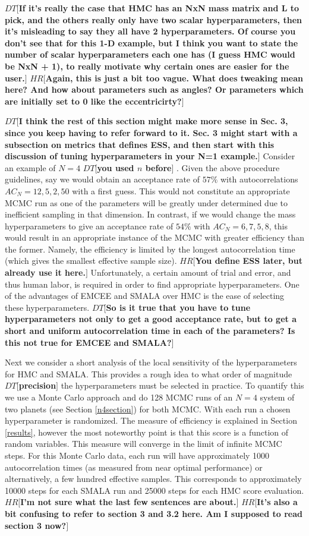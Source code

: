 \documentclass{aa}
\def\memohr#1{\color{blue}$HR[${\bf #1}$]$ \color{black}}
\def\memodt#1{\color{green}$DT[${\bf #1}$]$ \color{black}}
\begin{document}
\memodt{If it's really the case that HMC has an NxN mass matrix and L to pick, and the others really only have two scalar hyperparameters, then it's misleading to say they all have 2 hyperparameters. Of course you don't see that for this 1-D example, but I think you want to state the number of scalar hyperparameters each one has (I guess HMC would be NxN + 1), to really motivate why certain ones are easier for the user.}
\memohr{Again, this is just a bit too vague. What does tweaking mean here? And how about parameters such as angles? Or parameters which are initially set to 0 like the eccentricirty?}

\memodt{I think the rest of this section might make more sense in Sec. 3, since you keep having to refer forward to it. Sec. 3 might start with a subsection on metrics that defines ESS, and then start with this discussion of tuning hyperparameters in your N=1 example.}
Consider an example of $N=4$ \memodt{you used $n$ before}. 
Given the above procedure guidelines, say we would obtain an acceptance rate of $57\%$ with autocorrelations $AC_N = 12, 5, 2, 50$ with a first guess.
This would not constitute an appropriate MCMC run as one of the parameters will be greatly under determined due to inefficient sampling in that dimension. 
In contrast, if we would change the mass hyperparameters to give an acceptance rate of $54\%$ with $AC_N = 6, 7, 5, 8$, this would result in an appropriate instance of the MCMC with greater efficiency than the former. 
Namely, the efficiency is limited by the longest autocorrelation time (which gives the smallest effective sample size). 
\memohr{You define ESS later, but already use it here.}
Unfortunately, a certain amount of trial and error, and thus human labor, is required in order to find appropriate hyperparameters. 
One of the advantages of EMCEE and SMALA over HMC is the ease of selecting these hyperparameters. \memodt{So is it true that you have to tune hyperparameters not only to get a good acceptance rate, but to get a short and uniform autocorrelation time in each of the parameters? Is this not true for EMCEE and SMALA?}

Next we consider a short analysis of the local sensitivity of the hyperparameters for HMC and SMALA. 
This provides a rough idea to what order of magnitude \memodt{precision} the hyperparameters must be selected in practice. 
To quantify this we use a Monte Carlo approach and do 128 MCMC runs of an $N=4$ system of two planets (see Section \ref{n4section}) for both MCMC.
With each run a chosen hyperparameter is randomized. The measure of efficiency is explained in Section \ref{results}, however the most noteworthy point is that this score is a function of random variables. 
This measure will converge in the limit of infinite MCMC steps. 
For this Monte Carlo data, each run will have approximately 1000 autocorrelation times (as measured from near optimal performance) or alternatively, a few hundred effective samples. 
This corresponds to approximately 10000 steps for each SMALA run and 25000 steps for each HMC score evaluation. 
\memohr{I'm not sure what the last few sentences are about.}
\memohr{It's also a bit confusing to refer to section 3 and 3.2 here. Am I supposed to read section 3 now?}
\end{document}
